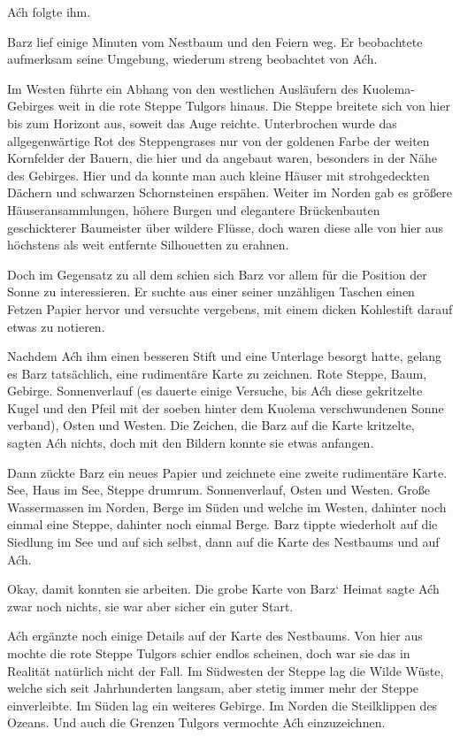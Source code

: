 Aćh folgte ihm.\bigskip






Barz lief einige Minuten vom Nestbaum und den Feiern weg. Er beobachtete aufmerksam seine Umgebung, wiederum streng beobachtet von Aćh.

Im Westen führte ein Abhang von den westlichen Ausläufern des Kuolema-Gebirges weit in die rote Steppe Tulgors hinaus. Die Steppe breitete sich von hier bis zum Horizont aus, soweit das Auge reichte. Unterbrochen wurde das allgegenwärtige Rot des Steppengrases nur von der goldenen Farbe der weiten Kornfelder der Bauern, die hier und da angebaut waren, besonders in der Nähe des Gebirges. Hier und da konnte man auch kleine Häuser mit strohgedeckten Dächern und schwarzen Schornsteinen erspähen. Weiter im Norden gab es größere Häuseransammlungen, höhere Burgen und elegantere Brückenbauten geschickterer Baumeister über wildere Flüsse, doch waren diese alle von hier aus höchstens als weit entfernte Silhouetten zu erahnen.

Doch im Gegensatz zu all dem schien sich Barz vor allem für die Position der Sonne zu interessieren. Er suchte aus einer seiner unzähligen Taschen einen Fetzen Papier hervor und versuchte vergebens, mit einem dicken Kohlestift darauf etwas zu notieren.

Nachdem Aćh ihm einen besseren Stift und eine Unterlage besorgt hatte, gelang es Barz tatsächlich, eine rudimentäre Karte zu zeichnen. Rote Steppe, Baum, Gebirge. Sonnenverlauf (es dauerte einige Versuche, bis Aćh diese gekritzelte Kugel und den Pfeil mit der soeben hinter dem Kuolema verschwundenen Sonne verband), Osten und Westen. Die Zeichen, die Barz auf die Karte kritzelte, sagten Aćh nichts, doch mit den Bildern konnte sie etwas anfangen.

Dann zückte Barz ein neues Papier und zeichnete eine zweite rudimentäre Karte. See, Haus im See, Steppe drumrum. Sonnenverlauf, Osten und Westen. Große Wassermassen im Norden, Berge im Süden und welche im Westen, dahinter noch einmal eine Steppe, dahinter noch einmal Berge. Barz tippte wiederholt auf die Siedlung im See und auf sich selbst, dann auf die Karte des Nestbaums und auf Aćh.

Okay, damit konnten sie arbeiten. Die grobe Karte von Barz‘ Heimat sagte Aćh zwar noch nichts, sie war aber sicher ein guter Start.

Aćh ergänzte noch einige Details auf der Karte des Nestbaums. Von hier aus mochte die rote Steppe Tulgors schier endlos scheinen, doch war sie das in Realität natürlich nicht der Fall. Im Südwesten der Steppe lag die Wilde Wüste, welche sich seit Jahrhunderten langsam, aber stetig immer mehr der Steppe einverleibte. Im Süden lag ein weiteres Gebirge. Im Norden die Steilklippen des Ozeans. Und auch die Grenzen Tulgors vermochte Aćh einzuzeichnen.

